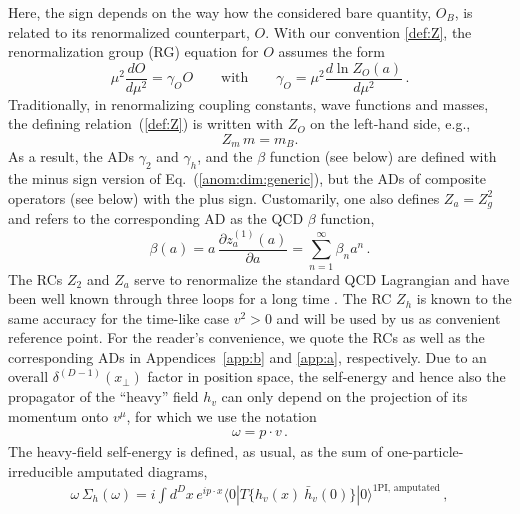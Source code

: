 \documentclass[12pt]{article}
\numberwithin{equation}{section}
\newcommand{\1}[1]{\mathbf{1}^{#1}}
\newcommand{\2}[1]{\mathbf{2}^{#1}}
\newcommand{\3}[1]{\mathbf{3}^{#1}}
\newcommand{\4}[1]{\mathbf{4}^{#1}}
\newcommand{\5}[1]{\mathbf{5}^{#1}}
\newcommand{\EQN}[1]{\hspace{3mm}\fbox{\fbox{$#1$}} \label{#1}}
\newcommand{\mlabel}[1]{ \text{\footnotesize \hspace{3mm}\fbox{\fbox{$#1$}} \label{#1}}}
\renewcommand{\EQN}[1]{\mlabel{#1}}
\renewcommand{\mlabel}[1]{\label{#1}}
\renewcommand{\EQN}[1]{\label{#1}}
\newcommand{\beq}{\begin{equation}}
\newcommand{\eeq}{\end{equation}}
\newcommand{\re}[1]{(\ref{#1})}
\newcommand{\ga}{\gamma}
\newcommand{\Si}{\Sigma}
\newcommand{\vv}{v^2}
\begin{document}
Here, the sign depends on the way  how the considered bare  quantity, $O_B$, is related  to its
renormalized counterpart, $O$. 
With our convention \eqref{def:Z},
the renormalization group (RG) equation for $O$ assumes the form
\beq
\mu^2\frac{d O}{d \mu^2}  = \ga_O O \qquad \text{with} \qquad 
\ga_O = \mu^2\frac{d \ln Z_O(a)}{d \mu^2}
\,.
\eeq
Traditionally, in renormalizing coupling constants, wave functions and masses, the
defining  relation~\re{def:Z} is written with $Z_O$ on the left-hand side, e.g.,
\[
  Z_m\, m = m_B {}.
\]  
 As a result,  the ADs $\ga_2$ and $\gamma_h$, and the $\beta$ function
(see below) are defined  with the minus sign  version of Eq.~\re{anom:dim:generic},
but the ADs of composite operators (see below) 
with the plus sign.
Customarily, one also  defines $Z_a =Z_g^2$ and refers to the corresponding AD
as the QCD $\beta$ function,
 \begin{equation} 
\beta(a) =
a\, \frac{ \partial  z^{(1)}_a(a)}{ \partial  a}
=
 \sum_{n=1}^\infty \beta_{n} a^{n}
\mlabel{beta:function:generic}
\,.
 \end{equation} 
The RCs $Z_2 $ and $Z_a$ serve to renormalize the
standard QCD Lagrangian and have been well known through three loops for a long time
\cite{Tarasov:1980au,Tarasov:2019rwk,Larin:1993tp}.
The RC $Z_h$ is  known to the same accuracy for the time-like case 
$\vv >  0$ \cite{Chetyrkin:2003vi} and will be used by us as convenient reference point. 
For the reader's convenience, we quote the RCs as well as the corresponding ADs
in Appendices~\ref{app:b} and \ref{app:a}, respectively.
Due to an overall $\delta^{(D-1)}(x_{\perp})$ factor in position space,
the self-energy and hence also the propagator of the ``heavy'' field $h_v$ 
can only depend on the projection of its momentum onto $v^\mu$, for which we use the notation
\begin{align}
   \omega = p\cdot v\,.
\end{align} 
The heavy-field  self-energy is defined, as usual, as the sum of one-particle-irreducible amputated diagrams, 
\begin{align}
\omega\, \Si_h(\omega) = i\int\! d^Dx\,  e^{ip\cdot x}
\langle 0|T\{ h_v(x)\  \bar{h}_v(0) \}|0\rangle^{\text{1PI, amputated}}\,,
\EQN{sigma:def}
\end{align}
\end{document}
